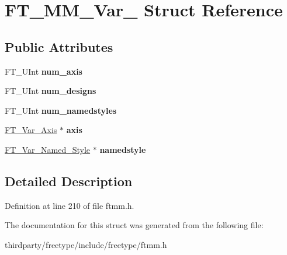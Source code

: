 \hypertarget{struct_f_t___m_m___var__}{}\section{F\+T\+\_\+\+M\+M\+\_\+\+Var\+\_\+ Struct Reference}
\label{struct_f_t___m_m___var__}
\subsection*{Public Attributes}
\begin{DoxyCompactItemize}
\item 
\mbox{\label{struct_f_t___m_m___var___acd32d4eb128f6fd9f6fde7da4c7b99bf}} 
F\+T\+\_\+\+U\+Int {\bfseries num\+\_\+axis}
\item 
\mbox{\label{struct_f_t___m_m___var___a5109a6a20626d90ed44cd64363d29e92}} 
F\+T\+\_\+\+U\+Int {\bfseries num\+\_\+designs}
\item 
\mbox{\label{struct_f_t___m_m___var___ac54bdd53447f4967b5d3b1a341a4bdff}} 
F\+T\+\_\+\+U\+Int {\bfseries num\+\_\+namedstyles}
\item 
\mbox{\label{struct_f_t___m_m___var___a19cc7772e057dad1c4acd6e744328466}} 
\hyperlink{struct_f_t___var___axis__}{F\+T\+\_\+\+Var\+\_\+\+Axis} $\ast$ {\bfseries axis}
\item 
\mbox{\label{struct_f_t___m_m___var___acda1ec5211250ddc06ec090f695adabf}} 
\hyperlink{struct_f_t___var___named___style__}{F\+T\+\_\+\+Var\+\_\+\+Named\+\_\+\+Style} $\ast$ {\bfseries namedstyle}
\end{DoxyCompactItemize}


\subsection{Detailed Description}


Definition at line 210 of file ftmm.\+h.



The documentation for this struct was generated from the following file\+:\begin{DoxyCompactItemize}
\item 
thirdparty/freetype/include/freetype/ftmm.\+h\end{DoxyCompactItemize}
